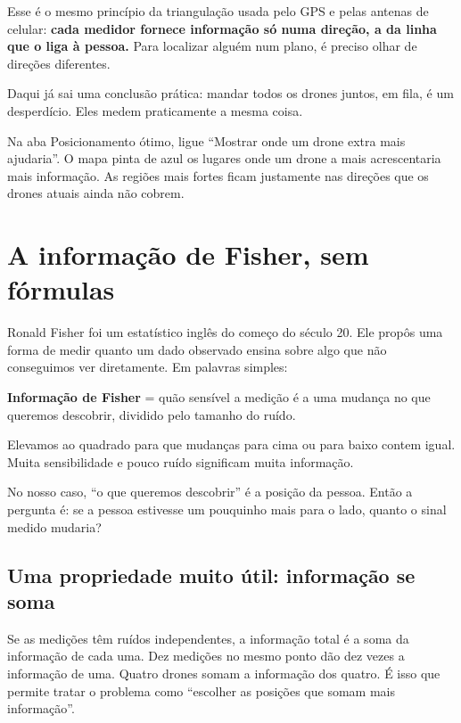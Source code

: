 \documentclass[11pt,a4paper]{article}
\begin{document}
Esse é o mesmo princípio da triangulação usada pelo GPS e pelas antenas de celular: \textbf{cada medidor fornece informação só numa direção, a da linha que o liga à pessoa.} Para localizar alguém num plano, é preciso olhar de direções diferentes.

Daqui já sai uma conclusão prática: mandar todos os drones juntos, em fila, é um desperdício. Eles medem praticamente a mesma coisa.

\begin{noapp}
Na aba Posicionamento ótimo, ligue \enquote{Mostrar onde um drone extra mais ajudaria}. O mapa pinta de azul os lugares onde um drone a mais acrescentaria mais informação. As regiões mais fortes ficam justamente nas direções que os drones atuais ainda não cobrem.
\end{noapp}

\section{A informação de Fisher, sem fórmulas}\label{sec:fisher}

Ronald Fisher foi um estatístico inglês do começo do século 20. Ele propôs uma forma de medir quanto um dado observado ensina sobre algo que não conseguimos ver diretamente. Em palavras simples:

\begin{ideia}
\textbf{Informação de Fisher} = quão sensível a medição é a uma mudança no que queremos descobrir, dividido pelo tamanho do ruído.

Elevamos ao quadrado para que mudanças para cima ou para baixo contem igual. Muita sensibilidade e pouco ruído significam muita informação.
\end{ideia}

No nosso caso, \enquote{o que queremos descobrir} é a posição da pessoa. Então a pergunta é: se a pessoa estivesse um pouquinho mais para o lado, quanto o sinal medido mudaria?

\subsection{Uma propriedade muito útil: informação se soma}
Se as medições têm ruídos independentes, a informação total é a soma da informação de cada uma. Dez medições no mesmo ponto dão dez vezes a informação de uma. Quatro drones somam a informação dos quatro. É isso que permite tratar o problema como \enquote{escolher as posições que somam mais informação}.
\end{document}
